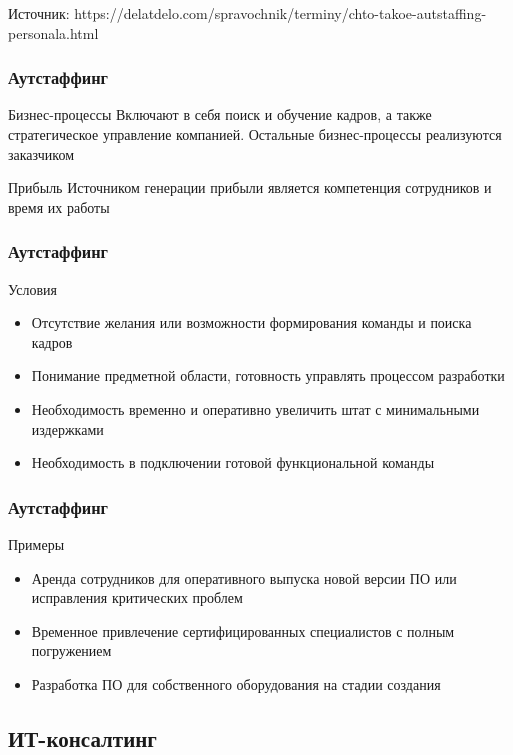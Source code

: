 \documentclass{../industrial-development}
\begin{document}
Источник: https://delatdelo.com/spravochnik/terminy/chto-takoe-autstaffing-personala.html


\begin{frame} \frametitle{Аутстаффинг}
	\begin{block}{Бизнес-процессы}
		Включают в себя поиск и обучение кадров, а также стратегическое управление компанией. Остальные бизнес-процессы реализуются заказчиком
	\end{block}
	\begin{block}{Прибыль}
		Источником генерации прибыли является компетенция сотрудников и время их работы
	\end{block}
\end{frame}
\lecturenotes


\begin{frame} \frametitle{Аутстаффинг}
	\begin{block}{Условия}
		\begin{itemize}
			\item Отсутствие желания или возможности формирования команды и поиска кадров
			\item Понимание предметной области, готовность управлять процессом разработки
			\item Необходимость временно и оперативно увеличить штат с минимальными издержками
			\item Необходимость в подключении готовой функциональной команды
		\end{itemize}
	\end{block}
\end{frame}
\lecturenotes


\begin{frame} \frametitle{Аутстаффинг}
	\begin{block}{Примеры}
		\begin{itemize}
			\item Аренда сотрудников для оперативного выпуска новой версии ПО или исправления критических проблем
			\item Временное привлечение сертифицированных специалистов с полным погружением
			\item Разработка ПО для собственного оборудования на стадии создания
		\end{itemize}
	\end{block}
\end{frame}
\lecturenotes


\subsection{ИТ-консалтинг}
\end{document}
